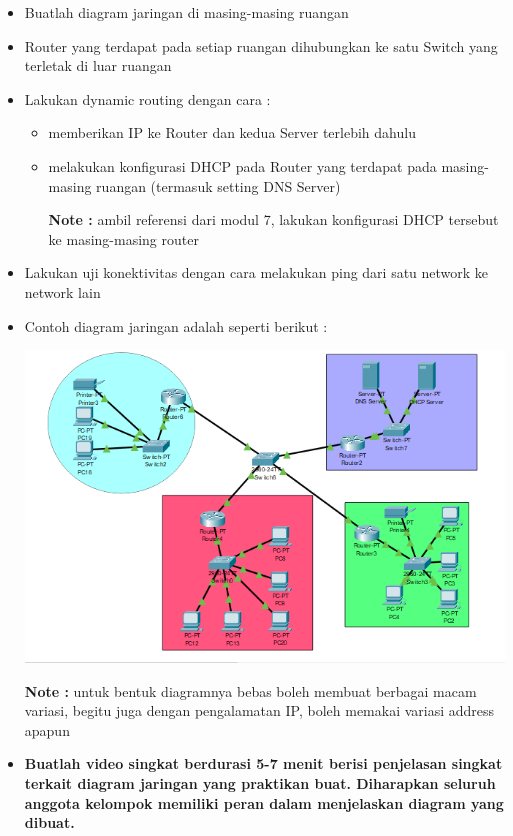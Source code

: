 \documentclass{article}
\begin{document}
	\begin{flushleft}
		\begin{itemize}
			\item Buatlah diagram jaringan di masing-masing ruangan
			
			\item Router yang terdapat pada setiap ruangan dihubungkan ke satu Switch yang terletak di luar ruangan

			\item Lakukan dynamic routing dengan cara : 
			\begin{itemize}
				\item memberikan IP ke Router dan kedua Server terlebih dahulu
				\item melakukan konfigurasi DHCP pada Router yang terdapat pada masing-masing ruangan (termasuk setting DNS Server)
				
				\hfill \break
				\textbf{Note : }ambil referensi dari modul 7, lakukan konfigurasi DHCP tersebut ke masing-masing router  
			\end{itemize}         

			\item Lakukan uji konektivitas dengan cara melakukan ping dari satu network ke network lain

			\item Contoh diagram jaringan adalah seperti berikut :
			\begin{center}
				\includegraphics[scale=0.6]{diagram.png}
			\end{center}
			\textbf{Note :} untuk bentuk diagramnya bebas boleh membuat berbagai macam variasi, begitu juga dengan pengalamatan IP, boleh memakai variasi address apapun

			\item \textbf{Buatlah video singkat berdurasi 5-7 menit berisi penjelasan singkat terkait diagram jaringan yang praktikan buat. Diharapkan seluruh anggota kelompok memiliki peran dalam menjelaskan diagram yang dibuat.} 
		\end{itemize}
	\end{flushleft}
	
\end{document}
